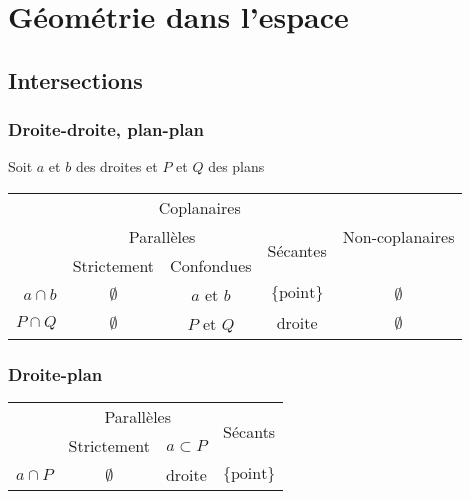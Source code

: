 \documentclass{article}
\begin{document}
\newpage
\section{Géométrie dans l'espace}

\subsection{Intersections}
\subsubsection{Droite-droite, plan-plan}

\begin{center}
    Soit $a$ et $b$ des droites et $P$ et $Q$ des plans
\end{center}

\begin{table}[h]
    \centering
\begin{tabular}{r|c|c|c|c}
           & \multicolumn{3}{c|}{Coplanaires}                                   & \multirow{3}{*}{Non-coplanaires} \\ \cline{2-4}
           & \multicolumn{2}{c|}{Parallèles}        & \multirow{2}{*}{Sécantes} &                                  \\ \cline{2-3}
           & Strictement  & Confondues    &                           &                                  \\ \hline\hline
$a \cap b$ & $\emptyset$  & $a$ et $b$    & $ \{ \text{point} \}$     & $ \emptyset$                     \\
$P \cap Q$ & $\emptyset$  & $P$ et $Q$    & $  \text{droite} $        & $  \emptyset$                   
\end{tabular}
\end{table}

\subsubsection{Droite-plan}

\begin{table}[H]
    \centering
    \begin{tabular}{r|c|c|c}
           & \multicolumn{2}{c|}{Parallèles}                & \multirow{2}{*}{Sécants} \\ \cline{2-3}
           & Strictement & $a \subset P$ &                          \\ \hline\hline
$a \cap P$ & $\emptyset$            & droite                & $\{ \text{point} \}$                   
\end{tabular}
\end{table}
\end{document}
